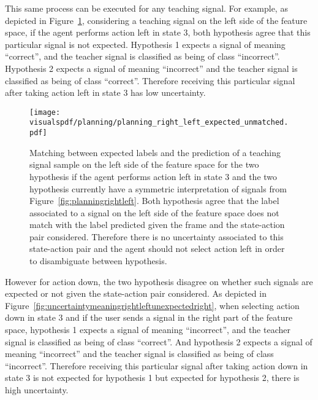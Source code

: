 This same process can be executed for any teaching signal. For example, as depicted in Figure~\ref{fig:uncertaintymeaningrightleftexpectedright}, considering a teaching signal on the left side of the feature space, if the agent performs action left in state 3, both hypothesis agree that this particular signal is not expected. Hypothesis 1 expects a signal of meaning ``correct'', and the teacher signal is classified as being of class ``incorrect''. Hypothesis 2 expects a signal of meaning ``incorrect'' and the teacher signal is classified as being of class ``correct''. Therefore receiving this particular signal after taking action left in state 3 has low uncertainty.

\begin{figure}[!ht]
  \centering
  \texttt{[image: \\visualspdf/planning/planning\_right\_left\_expected\_unmatched.pdf]}
  \caption{Matching between expected labels and the prediction of a teaching signal sample on the left side of the feature space for the two hypothesis if the agent performs action left in state 3 and the two hypothesis currently have a symmetric interpretation of signals from Figure~\ref{fig:planningrightleft}. Both hypothesis agree that the label associated to a signal on the left side of the feature space does not match with the label predicted given the frame and the state-action pair considered. Therefore there is no uncertainty associated to this state-action pair and the agent should not select action left in order to disambiguate between hypothesis.}
  \label{fig:uncertaintymeaningrightleftexpectedright}
\end{figure}


However for action down, the two hypothesis disagree on whether such signals are expected or not given the state-action pair considered. As depicted in Figure~\ref{fig:uncertaintymeaningrightleftunexpectedright}, when selecting action down in state 3 and if the user sends a signal in the right part of the feature space, hypothesis 1 expects a signal of meaning ``incorrect'', and the teacher signal is classified as being of class ``correct''. And hypothesis 2 expects a signal of meaning ``incorrect'' and the teacher signal is classified as being of class ``incorrect''. Therefore receiving this particular signal after taking action down in state 3 is not expected for hypothesis 1 but expected for hypothesis 2, there is high uncertainty.

